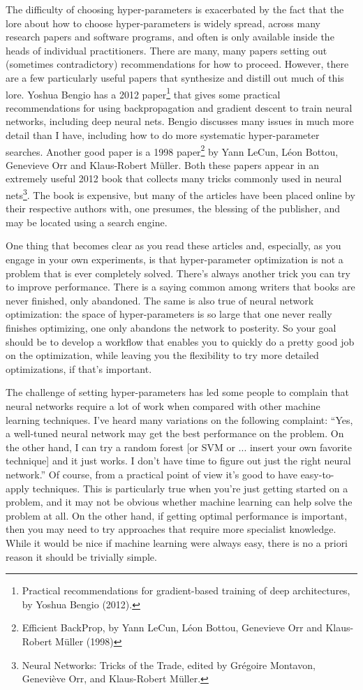 \documentclass[a4paper,twoside,10pt]{book}
\begin{document}
The difficulty of choosing hyper-parameters is exacerbated by the fact that the lore about how to choose hyper-parameters is widely spread, across many research papers and software programs, and often is only available inside the heads of individual practitioners. There are many, many papers setting out (sometimes contradictory) recommendations for how to proceed. However, there are a few particularly useful papers that synthesize and distill out much of this lore. Yoshua Bengio has a 2012 paper\footnote{Practical recommendations for gradient-based training of deep architectures, by Yoshua Bengio (2012).} that gives some practical recommendations for using backpropagation and gradient descent to train neural networks, including deep neural nets. Bengio discusses many issues in much more detail than I have, including how to do more systematic hyper-parameter searches. Another good paper is a 1998 paper\footnote{Efficient BackProp, by Yann LeCun, Léon Bottou, Genevieve Orr and Klaus-Robert M\"{u}ller (1998)} by Yann LeCun, L\'{e}on Bottou, Genevieve Orr and Klaus-Robert M\"{u}ller. Both these papers appear in an extremely useful 2012 book that collects many tricks commonly used in neural nets\footnote{Neural Networks: Tricks of the Trade, edited by Gr\'egoire Montavon, Genevi\`eve Orr, and Klaus-Robert M\"{u}ller.}. The book is expensive, but many of the articles have been placed online by their respective authors with, one presumes, the blessing of the publisher, and may be located using a search engine.

One thing that becomes clear as you read these articles and, especially, as you engage in your own experiments, is that hyper-parameter optimization is not a problem that is ever completely solved. There's always another trick you can try to improve performance. There is a saying common among writers that books are never finished, only abandoned. The same is also true of neural network optimization: the space of hyper-parameters is so large that one never really finishes optimizing, one only abandons the network to posterity. So your goal should be to develop a workflow that enables you to quickly do a pretty good job on the optimization, while leaving you the flexibility to try more detailed optimizations, if that's important.

The challenge of setting hyper-parameters has led some people to complain that neural networks require a lot of work when compared with other machine learning techniques. I've heard many variations on the following complaint: ``Yes, a well-tuned neural network may get the best performance on the problem. On the other hand, I can try a random forest [or SVM or ... insert your own favorite technique] and it just works. I don't have time to figure out just the right neural network.'' Of course, from a practical point of view it's good to have easy-to-apply techniques. This is particularly true when you're just getting started on a problem, and it may not be obvious whether machine learning can help solve the problem at all. On the other hand, if getting optimal performance is important, then you may need to try approaches that require more specialist knowledge. While it would be nice if machine learning were always easy, there is no a priori reason it should be trivially simple.
\end{document}
